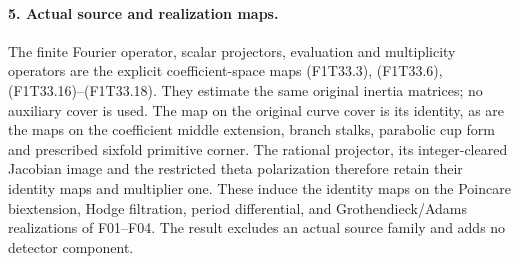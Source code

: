 \paragraph{5. Actual source and realization maps.}
The finite Fourier operator, scalar projectors,
evaluation and multiplicity operators are the explicit
coefficient-space maps (F1T33.3), (F1T33.6),
(F1T33.16)--(F1T33.18). They estimate the same
original inertia matrices; no auxiliary cover is used.
The map on the original curve cover is its identity,
as are the maps on the coefficient middle extension,
branch stalks, parabolic cup form and prescribed
sixfold primitive corner. The rational projector,
its integer-cleared Jacobian image and the restricted
theta polarization therefore retain their identity
maps and multiplier one. These induce the identity
maps on the Poincare biextension, Hodge filtration,
period differential, and Grothendieck/Adams
realizations of F01--F04. The result excludes an
actual source family and adds no detector component.
